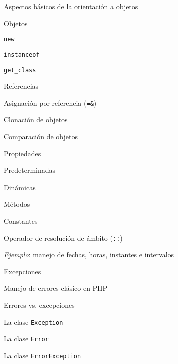 \begin{longenum}
\begin{longenum}
\begin{longenum}
        \end{longenum}
        \item Aspectos básicos de la orientación a objetos
        \begin{longenum}
            \item Objetos
            \begin{longenum}
                \item \texttt{new}
                \item \texttt{instanceof}
                \item \texttt{get\_class}
            \end{longenum}
            \item Referencias
            \begin{longenum}
                \item Asignación por referencia (\texttt{=\&})
            \end{longenum}
            \item Clonación de objetos
            \item Comparación de objetos
            \item Propiedades
            \begin{longenum}
                \item Predeterminadas
                \item Dinámicas
            \end{longenum}
            \item Métodos
            \item Constantes
            \begin{longenum}
                \item Operador de resolución de ámbito (\texttt{::})
            \end{longenum}
            \item \textit{Ejemplo}: manejo de fechas, horas, instantes e intervalos
        \end{longenum}
        \item Excepciones
        \begin{longenum}
            \item Manejo de errores clásico en PHP
            \item Errores vs. excepciones
            \item La clase \texttt{Exception}
            \item La clase \texttt{Error}
            \item La clase \texttt{ErrorException}

\end{longenum}
\end{longenum}
\end{longenum}

